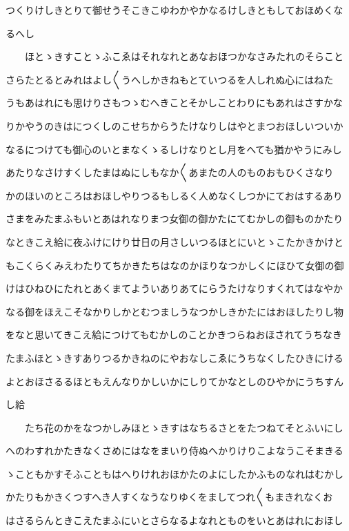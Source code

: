 \documentclass[a4paper,11pt,landscape]{ltjtarticle}
\begin{document}
つくりけしきとりて御せうそこきこゆわかやかなるけしきともしておほめくな
\par\medskip
るへし
\par\medskip
　　ほとゝきすことゝふこゑはそれなれとあなおほつかなさみたれのそらこと
\par\medskip
さらたとるとみれはよし〱うへしかきねもとていつるを人しれぬ心にはねた
\par\medskip
うもあはれにも思けりさもつゝむへきことそかしことわりにもあれはさすかな
\par\medskip
りかやうのきはにつくしのこせちからうたけなりしはやとまつおほしいついか
\par\medskip
なるにつけても御心のいとまなくゝるしけなりとし月をへても猶かやうにみし
\par\medskip
あたりなさけすくしたまはぬにしもなか〱あまたの人のものおもひくさなり
\par\medskip
かのほいのところはおほしやりつるもしるく人めなくしつかにておはするあり
\par\medskip
さまをみたまふもいとあはれなりまつ女御の御かたにてむかしの御ものかたり
\par\medskip
なときこえ給に夜ふけにけり廿日の月さしいつるほとにいとゝこたかきかけと
\par\medskip
もこくらくみえわたりてちかきたちはなのかほりなつかしくにほひて女御の御
\par\medskip
けはひねひにたれとあくまてよういありあてにらうたけなりすくれてはなやか
\par\medskip
なる御をほえこそなかりしかとむつましうなつかしきかたにはおほしたりし物
\par\medskip
をなと思いてきこえ給につけてもむかしのことかきつらねおほされてうちなき
\par\medskip
たまふほとゝきすありつるかきねのにやおなしこゑにうちなくしたひきにける
\par\medskip
よとおほさるるほともえんなりかしいかにしりてかなとしのひやかにうちすん
\par\medskip
し給
\par\medskip
　　たち花のかをなつかしみほとゝきすはなちるさとをたつねてそとふいにし
\par\medskip
へのわすれかたきなくさめにはなをまいり侍ぬへかりけりこよなうこそまきる
\par\medskip
ゝこともかすそふこともはへりけれおほかたのよにしたかふものなれはむかし
\par\medskip
かたりもかきくつすへき人すくなうなりゆくをましてつれ〱もまきれなくお
\par\medskip
はさるらんときこえたまふにいとさらなるよなれとものをいとあはれにおほし
\end{document}

